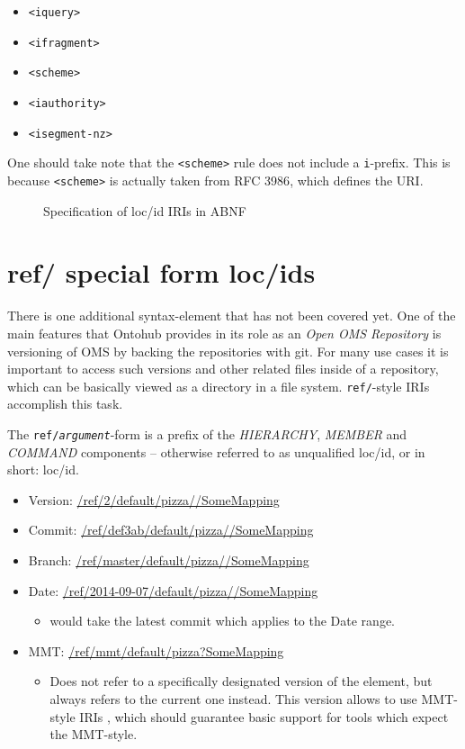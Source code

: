 \documentclass[10pt,fleqn,final]{scrreprt}
\newcommand{\cbs}[0]{\color{red}\xspace} %
\newcommand{\cbe}[0]{\color{black}\xspace} %
\begin{document}
\begin{itemize}
  \item \texttt{<iquery>}
  \item \texttt{<ifragment>}
  \item \texttt{<scheme>}
  \item \texttt{<iauthority>}
  \item \texttt{<isegment-nz>}
\end{itemize}

One should take note that the \texttt{<scheme>} rule does not include a
\texttt{i}-prefix.  This is because \texttt{<scheme>} is actually taken from
RFC 3986\cite{rfc3986}, which defines the URI.

\begin{figure}[b]
  \centering
  
  \caption[loc/id specification in ABNF]
   {Specification of loc/id IRIs in ABNF}
  \label{lst:loc-id-spec}
\end{figure}

\clearpage
\section{ref/ special form loc/ids}

There is one additional syntax-element\cbs that has not been covered yet.\cbe One of the
main features that Ontohub provides in its role as an \emph{Open OMS Repository}
is versioning of OMS by backing the repositories with git.\cbs For many use cases it is 
important to access such\cbe versions and other related files inside of a
repository, which can be basically viewed as a directory in a file system.
\texttt{ref/}-style IRIs accomplish this task.

The \texttt{ref/\emph{argument}}-form is a prefix of the \emph{HIERARCHY},
\emph{MEMBER} and \emph{COMMAND} components -- otherwise referred to as
unqualified loc/id, or in short: loc/id.

\begin{itemize}
  \item Version: \url{/ref/2/default/pizza//SomeMapping}
  \item Commit: \url{/ref/def3ab/default/pizza//SomeMapping}
  \item Branch: \url{/ref/master/default/pizza//SomeMapping}
  \item Date: \url{/ref/2014-09-07/default/pizza//SomeMapping}
    \begin{itemize}
      \item would take the latest commit which applies to the Date range.
    \end{itemize}
  \item MMT: \url{/ref/mmt/default/pizza?SomeMapping}
    \begin{itemize}
      \item Does not refer to a specifically designated version of the element,
        but always refers to the current one instead. This version allows to
        use MMT-style IRIs \cite{RabKoh:WSMSML13}, 
        which should guarantee basic support for tools
        which expect the MMT-style.
    \end{itemize}
\end{itemize}
\end{document}
